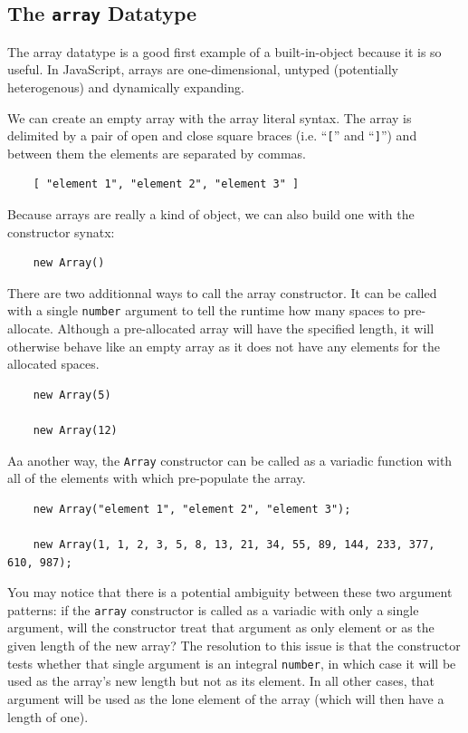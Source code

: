 \documentclass[11pt,letter]{book}
\begin{document}
    \subsection{The \texttt{array} Datatype}
    
    The array datatype is a good first example of a built-in-object because it is so useful. In 
    JavaScript, arrays are one-dimensional, untyped (potentially heterogenous) and dynamically 
    expanding. 
    
    We can create an empty array with the array literal syntax. The array is delimited by a pair of 
    open and close square braces (i.e. ``\texttt{[}'' and ``\texttt{]}'') and between them the 
    elements are separated by commas.
    
    \begin{verbatim}
    [ "element 1", "element 2", "element 3" ]
    \end{verbatim}
    
    Because arrays are really a kind of object, we can also build one with the constructor synatx:
    
    \begin{verbatim}
    new Array()
    \end{verbatim}
    
    There are two additionnal ways to call the array constructor. It can be called with a single 
    \texttt{number} argument to tell the runtime how many spaces to pre-allocate. Although a 
    pre-allocated array will have the specified length, it will otherwise behave like an empty array
    as it does not have any elements for the allocated spaces.
    
    \begin{verbatim}
    new Array(5)
    
    new Array(12)
    \end{verbatim}
    
    Aa another way, the \texttt{Array} constructor can be called as a variadic function with all of 
    the elements with which pre-populate the array.
    
    \begin{verbatim}
    new Array("element 1", "element 2", "element 3");
    
    new Array(1, 1, 2, 3, 5, 8, 13, 21, 34, 55, 89, 144, 233, 377, 610, 987);
    \end{verbatim}
    
    You may notice that there is a potential ambiguity between these two argument patterns: if the
    \texttt{array} constructor is called as a variadic with only a single argument, will the
    constructor treat that argument as only element or as the given length of the new array? The 
    resolution to this issue is that the constructor tests whether that single argument is an 
    integral \texttt{number}, in which case it will be used as the array's new length but not as its 
    element. In all other cases, that argument will be used as the lone element of the array (which 
    will then have a length of one). 
    
\end{document}
